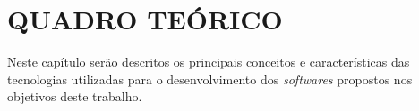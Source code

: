 \chapter{QUADRO TEÓRICO}

	\par Neste capítulo serão descritos os principais conceitos e características
das tecnologias utilizadas para o desenvolvimento dos \textit{softwares}
propostos nos objetivos deste trabalho.








%

%


